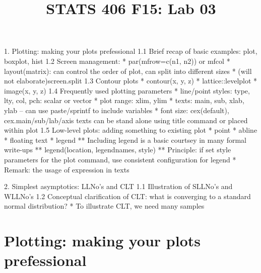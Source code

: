 \documentclass[10pt]{article}
\begin{document}
\title{\Large \bf STATS 406 F15: Lab 03}
\date{}

\maketitle


1. Plotting: making your plots prefessional
1.1 Brief recap of basic examples: plot, boxplot, hist
1.2 Screen management:
* par(mfrow=c(n1, n2)) or mfcol
* layout(matrix): can control the order of plot, can split into different sizes
* (will not elaborate)screen.split
1.3 Contour plots
* contour(x, y, z)
* lattice::levelplot
* image(x, y, z)
1.4 Frequently used plotting parameters
* line/point styles: type, lty, col, pch: scalar or vector
* plot range: xlim, ylim
* texts: main, sub, xlab, ylab -- can use paste/sprintf to include variables
* font size: cex(default), cex.main/sub/lab/axis
texts can be stand alone using title command or placed within plot
1.5 Low-level plots: adding something to existing plot
* point
* abline
* floating text
* legend
**  Including legend is a basic courtsey in many formal write-ups
**  legend(location, legendnames, style)
**  Principle: if set style parameters for the plot command, use consistent configuration for legend
* Remark: the usage of expression in texts

2. Simplest asymptotics: LLNo's and CLT
1.1 Illustration of SLLNo's and WLLNo's
1.2 Conceptual clarification of CLT: what is converging to a standard normal distribution?
* To illustrate CLT, we need many samples


\section{Plotting: making your plots prefessional}
\end{document}
